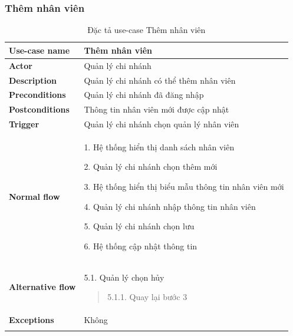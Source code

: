 \subsubsection{Thêm nhân viên}
{
    \setlength\extrarowheight{6pt}
    \begin{longtable}{| p{} | p{} |}
        \hline
        \textbf{Use-case name}
         &
        Thêm nhân viên
        \\
        \hline
        \textbf{Actor}
         &
        Quản lý chi nhánh
        \\
        \hline
        \textbf{Description}
         &
        Quản lý chi nhánh có thể thêm nhân viên
        \\
        \hline
        \textbf{Preconditions}
         &
        Quản lý chi nhánh đã đăng nhập
        \\
        \hline
        \textbf{Postconditions}
         &
        Thông tin nhân viên mới được cập nhật
        \\
        \hline
        \textbf{Trigger}
         &
        Quản lý chi nhánh chọn quản lý nhân viên
        \\
        \hline
        \begin{flushleft}
            \textbf{Normal flow}
        \end{flushleft}
         &
        1. Hệ thống hiển thị danh sách nhân viên

        2. Quản lý chi nhánh chọn thêm mới

        3. Hệ thống hiển thị biểu mẫu thông tin  nhân viên mới

        4. Quản lý chi nhánh nhập thông tin nhân viên

        5. Quản lý chi nhánh chọn lưu

        6. Hệ thống cập nhật thông tin
        \\
        \hline
        \begin{flushleft}
            \textbf{Alternative flow}
        \end{flushleft}
         &
        5.1. Quản lý chọn hủy
        \begin{quote}
            5.1.1. Quay lại bước 3
        \end{quote}
        \\
        \hline
        \textbf{Exceptions}
         &
        Không
        \\
        \hline
        \caption{Đặc tả use-case Thêm nhân viên}
    \end{longtable}
}

